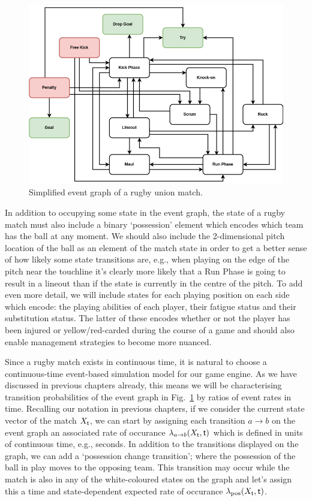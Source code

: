 \begin{figure}[h]
\includegraphics[width=14cm]{images/trywizard-event-graph.drawio.png}
\caption{Simplified event graph of a rugby union match.}
\label{fig:event-graph}
\end{figure}

In addition to occupying some state in the event graph, the state of a rugby match must also include a binary `possession' element which encodes which team has the ball at any moment. We should also include the 2-dimensional pitch location of the ball as an element of the match state in order to get a better sense of how likely some state transitions are, e.g., when playing on the edge of the pitch near the touchline it's clearly more likely that a Run Phase is going to result in a lineout than if the state is currently in the centre of the pitch. To add even more detail, we will include states for each playing position on each side which encode: the playing abilities of each player, their fatigue status and their substitution status. The latter of these encodes whether or not the player has been injured or yellow/red-carded during the course of a game and should also enable management strategies to become more nuanced.

Since a rugby match exists in continuous time, it is natural to choose a continuous-time event-based simulation model for our game engine. As we have discussed in previous chapters already, this means we will be characterising transition probabilities of the event graph in Fig.~\ref{fig:event-graph} by ratios of event rates in time. Recalling our notation in previous chapters, if we consider the current state vector of the match $X_{\sf t}$, we can start by assigning each transition $a\rightarrow b$ on the event graph an associated rate of occurance $\lambda_{a\rightarrow b} (X_{\sf t}, {\sf t})$ which is defined in units of continuous time, e.g., seconds. In addition to the transitions displayed on the graph, we can add a `possession change transition'; where the possession of the ball in play moves to the opposing team. This transition may occur while the match is also in any of the white-coloured states on the graph and let's assign this a time and state-dependent expected rate of occurance $\lambda_{\rm pos}(X_{\sf t}, {\sf t})$.

